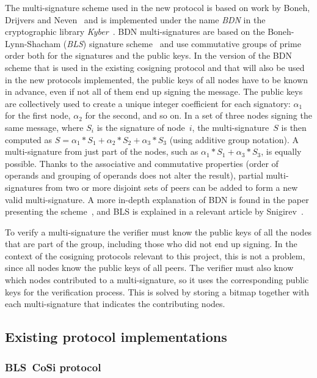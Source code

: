 The multi-signature scheme used in the new protocol is based on work by Boneh, Drijvers and Neven~\cite{Boneh18} and is implemented under the name \emph{BDN} in the cryptographic library \emph{Kyber}~\cite{Kyber}.
BDN multi-signatures are based on the Boneh-Lynn-Shacham (\emph{BLS}) signature scheme~\cite{Boneh01} and use commutative groups of prime order both for the signatures and the public keys.
In the version of the BDN scheme that is used in the existing cosigning protocol and that will also be used in the new protocols implemented, the public keys of all nodes have to be known in advance, even if not all of them end up signing the message.
The public keys are collectively used to create a unique integer coefficient for each signatory: $\alpha_1$ for the first node, $\alpha_2$ for the second, and so on.
In a set of three nodes signing the same message, where $S_i$ is the signature of node~$i$, the multi-signature~$S$ is then computed as $S = \alpha_1 * S_1 + \alpha_2 * S_2 + \alpha_3 * S_3$ (using additive group notation).
A multi-signature from just part of the nodes, such as $\alpha_1 * S_1 + \alpha_3 * S_3$, is equally possible.
Thanks to the associative and commutative properties (order of operands and grouping of operands does not alter the result), partial multi-signatures from two or more disjoint sets of peers can be added to form a new valid multi-signature. A more in-depth explanation of BDN is found in the paper presenting the scheme~\cite{Boneh18}, and BLS is explained in a relevant article by Snigirev~\cite{Snig18}.

To verify a multi-signature the verifier must know the public keys of all the nodes that are part of the group, including those who did not end up signing. In the context of the cosigning protocols relevant to this project, this is not a problem, since all nodes know the public keys of all peers.
The verifier must also know which nodes contributed to a multi-signature, so it uses the corresponding public keys for the verification process. This is solved by storing a bitmap together with each multi-signature that indicates the contributing nodes.


\subsection{Existing protocol implementations}

\subsubsection{BLS~CoSi protocol}

